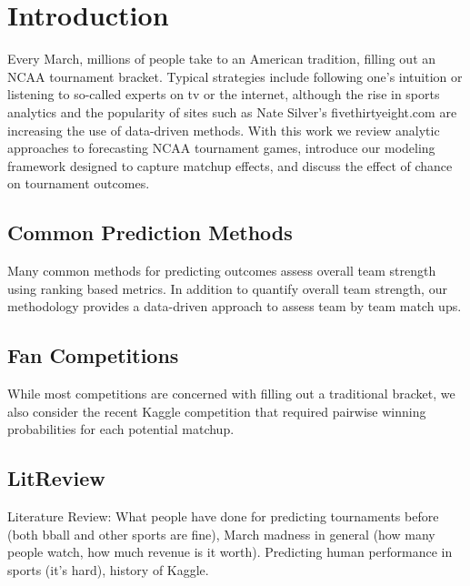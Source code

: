 \section{Introduction}
 Every March, millions of people take to an American tradition, filling out an NCAA tournament bracket.  Typical strategies include following one's intuition or listening to so-called experts on tv or the internet, although the rise in sports analytics and the popularity of sites such as Nate Silver's fivethirtyeight.com are increasing the use of data-driven methods.  With this work we review analytic approaches to forecasting NCAA tournament games, introduce our modeling framework designed to capture matchup effects, and discuss the effect of chance on tournament outcomes.  
\subsection{Common Prediction Methods}
Many common methods for predicting outcomes assess overall team strength using ranking based metrics.  In addition to quantify overall team strength, our methodology provides a data-driven approach to assess team by team match ups. 
\subsection{Fan Competitions}  While most competitions are concerned with filling out a traditional bracket, we also consider the recent Kaggle competition that required pairwise winning probabilities for each potential matchup.
\subsection{LitReview}
Literature Review: What people have done for predicting tournaments before (both bball and other sports are fine), March madness in general (how many people watch, how much revenue is it worth). Predicting human performance in sports (it's hard), history of Kaggle.
